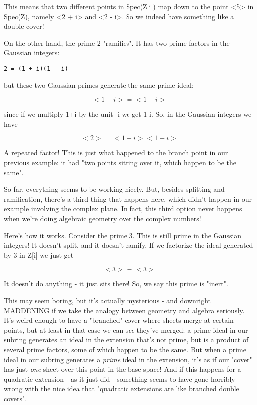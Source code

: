 This means that two different points in Spec(Z[i]) map down to the
point <5> in Spec(Z), namely <2 + i> and <2 - i>.  
So we indeed have
something like a double cover!

On the other hand, the prime 2 "ramifies".  It has two prime 
factors in the Gaussian integers:

\begin{verbatim}
2 = (1 + i)(1 - i)
\end{verbatim}
    
but these two Gaussian primes generate the same prime ideal:

$$
<1 + i> = <1 - i>
$$
    

since if we multiply 1+i by the unit -i we get 1-i.  So, in the 
Gaussian integers we have

$$
<2> = <1 + i> <1 + i>
$$
    

A repeated factor!  This is just what happened to the branch point in 
our previous example: it had "two points sitting over it, which happen 
to be the same".  

So far, everything seems to be working nicely.  But, besides splitting 
and ramification, there's a third thing that happens here, which didn't 
happen in our example involving the complex plane.  In fact, this third 
option never happens when we're doing algebraic geometry over the complex 
numbers!  

Here's how it works.  Consider the prime 3.  This is still prime in the
Gaussian integers!  It doesn't split, and it doesn't ramify.  If we
factorize the ideal generated by 3 in Z[i] we just get

$$
<3> = <3>
$$
    

It doesn't do anything - it just sits there!
So, we say this prime is "inert".

This may seem boring, but it's actually mysterious - and downright 
MADDENING if we take the analogy between geometry and algebra seriously.
It's weird enough to have a "branched" cover where sheets merge at 
certain points, but at least in that case we can \emph{see} they've merged:
a prime ideal in our subring generates an ideal in the extension that's 
not prime, but is a product of several prime factors, some of which 
happen to be the same.  But when a prime ideal in our subring generates 
a \emph{prime}
ideal in the extension, it's as if our "cover" has just \emph{one}
sheet over this point in the base space!   And if this happens for a 
quadratic extension - as it just did - something seems to have gone 
horribly wrong with the nice idea that "quadratic extensions are like 
branched double covers".

